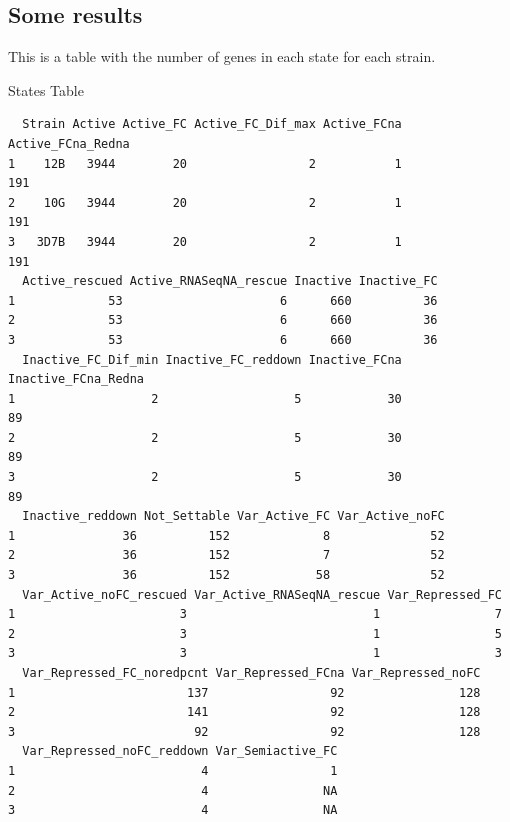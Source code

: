 \documentclass[11pt]{article}
\begin{document}
\subsection{Some results}
\label{sec:org2d1ca63}
This is a table with the number of genes in each state for each strain.

States Table
\begin{verbatim}
  Strain Active Active_FC Active_FC_Dif_max Active_FCna Active_FCna_Redna
1    12B   3944        20                 2           1               191
2    10G   3944        20                 2           1               191
3   3D7B   3944        20                 2           1               191
  Active_rescued Active_RNASeqNA_rescue Inactive Inactive_FC
1             53                      6      660          36
2             53                      6      660          36
3             53                      6      660          36
  Inactive_FC_Dif_min Inactive_FC_reddown Inactive_FCna Inactive_FCna_Redna
1                   2                   5            30                  89
2                   2                   5            30                  89
3                   2                   5            30                  89
  Inactive_reddown Not_Settable Var_Active_FC Var_Active_noFC
1               36          152             8              52
2               36          152             7              52
3               36          152            58              52
  Var_Active_noFC_rescued Var_Active_RNASeqNA_rescue Var_Repressed_FC
1                       3                          1                7
2                       3                          1                5
3                       3                          1                3
  Var_Repressed_FC_noredpcnt Var_Repressed_FCna Var_Repressed_noFC
1                        137                 92                128
2                        141                 92                128
3                         92                 92                128
  Var_Repressed_noFC_reddown Var_Semiactive_FC
1                          4                 1
2                          4                NA
3                          4                NA
\end{verbatim}
\end{document}
